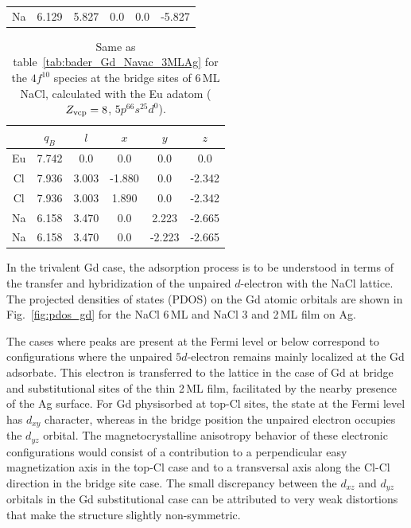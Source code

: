 {\begin{table}[h!]
\begin{ruledtabular}
\begin{tabular}{c  c  c  c  c  c  }
   Na & 6.129 & 5.827 &  0.0   &   0.0   &  -5.827

\end{tabular}
\end{ruledtabular}
\label{tab:bader_Eu_topCl_6ML}
\end{table}


\begin{table}[h!]
\caption{Same as table~\ref{tab:bader_Gd_Navac_3MLAg} for the $4f^{10}$ species at the bridge sites of 6\,ML NaCl, calculated with the Eu adatom ($Z_{\rm vcp}=8$, $5p^66s^25d^0$).}
\renewcommand{\arraystretch}{1.13}
\begin{ruledtabular}
 \begin{tabular}{c  c  c  c  c  c  }
     &  $q_B$ & $l$ &  $x$  & $y$ &  $z$ \\
\hline

   Eu & 7.742 & 0.0 &  0.0 &   0.0 &   0.0 \\

   Cl & 7.936 & 3.003 &  -1.880 &   0.0 &   -2.342 \\
   Cl & 7.936 & 3.003 &   1.890 &   0.0 &   -2.342 \\




   Na & 6.158 & 3.470 &  0.0   &  2.223 & -2.665 \\
   Na & 6.158 & 3.470 &  0.0   & -2.223 & -2.665 \\




\end{tabular}
\end{ruledtabular}
\label{tab:bader_Eu_bridge_6ML}

\end{table}


In the trivalent Gd case, the adsorption process is to be understood in terms of the transfer and hybridization of the unpaired $d$-electron with the NaCl lattice.  The projected densities of states (PDOS) on the Gd atomic orbitals are shown in Fig.~\ref{fig:pdos_gd} for the NaCl 6\,ML and NaCl 3 and 2\,ML film on Ag.

The cases where peaks are present at the Fermi level or below correspond to configurations where the unpaired $5d$-electron remains mainly localized at the Gd adsorbate. This electron is transferred to the lattice in the case of Gd at bridge and substitutional sites of the thin 2\,ML film, facilitated by the nearby presence of the Ag surface. For Gd physisorbed at top-Cl sites, the state at the Fermi level has $d_{xy}$ character, whereas in the bridge position the unpaired electron occupies the $d_{yz}$ orbital.  The magnetocrystalline anisotropy behavior of these electronic configurations would consist of a contribution to a perpendicular easy magnetization axis in the top-Cl case and to a transversal axis along the Cl-Cl direction in the bridge site case. The small discrepancy between the $d_{xz}$ and $d_{yz}$ orbitals in the Gd substitutional case can be attributed to very weak distortions that make the structure slightly non-symmetric.

}
